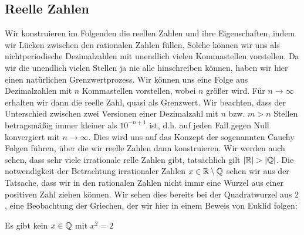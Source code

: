 \subsection{Reelle Zahlen}
\label{\detokenize{grundlagen/zahlensysteme:reelle-zahlen}}
Wir konstruieren im Folgenden die reellen Zahlen und ihre Eigenschaften, indem wir Lücken zwischen den rationalen Zahlen füllen. Solche können wir uns als nichtperiodische Dezimalzahlen mit unendlich vielen Kommastellen vorstellen. Da wir die unendlich vielen Stellen ja nie alle hinschreiben können, haben wir hier einen natürlichen Grenzwertprozess. Wir können uns eine Folge aus Dezimalzahlen mit \(n\) Kommastellen vorstellen, wobei \(n\) größer wird. Für \(n \rightarrow \infty\) erhalten wir dann die reelle Zahl, quasi als Grenzwert. Wir beachten, dass der Unterschied zwischen zwei Versionen einer Dezimalzahl mit \(n\) bzw. \(m > n\) Stellen betragsmäßig immer kleiner als \(10^{-n+1}\) ist, d.h. auf jeden Fall gegen Null konvergiert mit \(n \rightarrow \infty\). Dies wird uns auf das Konzept der sogenannten Cauchy Folgen führen, über die wir reelle Zahlen dann konstruieren. Wir werden auch sehen, dass sehr viele irrationale relle Zahlen gibt, tatsächlich gilt \(|\mathbb{R}| > |\mathbb{Q}|\).
Die notwendigkeit der Betrachtung irrationaler Zahlen \(x \in \mathbb{R} \setminus \mathbb{Q}\) sehen wir aus der Tatsache, dass wir in den rationalen Zahlen nicht immr eine Wurzel aus einer positiven Zahl ziehen können. Wir sehen dies bereits bei der Quadratwurzel aus \(2\), eine Beobachtung der Griechen, der wir hier in einem Beweis von Euklid folgen:
\label{grundlagen/zahlensysteme:theorem-12}
\begin{theorem}{}{}



Es gibt kein \(x \in \mathbb{Q}\) mit \(x^2 = 2\)
\end{theorem}

